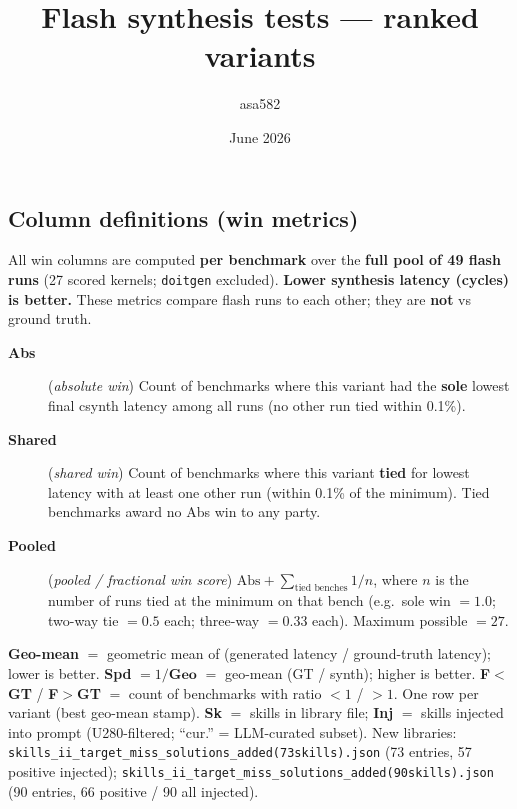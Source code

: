 \documentclass[11pt]{article}
\title{Flash synthesis tests --- ranked variants}
\author{asa582}
\date{June 2026}
\begin{document}
\maketitle

\subsection*{Column definitions (win metrics)}

All win columns are computed \textbf{per benchmark} over the \textbf{full pool of 49 flash runs}
(27 scored kernels; \texttt{doitgen} excluded). \textbf{Lower synthesis latency (cycles) is better.}
These metrics compare flash runs to each other; they are \textbf{not} vs ground truth.

\begin{description}
  \item[\textbf{Abs}] (\emph{absolute win})
    Count of benchmarks where this variant had the \textbf{sole} lowest final csynth latency
    among all runs (no other run tied within 0.1\%).
  \item[\textbf{Shared}] (\emph{shared win})
    Count of benchmarks where this variant \textbf{tied} for lowest latency with at least one
    other run (within 0.1\% of the minimum). Tied benchmarks award no Abs win to any party.
  \item[\textbf{Pooled}] (\emph{pooled / fractional win score})
    $\text{Abs} + \sum_{\text{tied benches}} 1/n$, where $n$ is the number of runs tied at the
    minimum on that bench (e.g.\ sole win $=1.0$; two-way tie $=0.5$ each; three-way $=0.33$ each).
    Maximum possible $=27$.
\end{description}

\noindent\textbf{Geo-mean} $=$ geometric mean of (generated latency / ground-truth latency); lower is better.
\textbf{Spd} $= 1/\textbf{Geo}$ $=$ geo-mean (GT / synth); higher is better.
\textbf{F$<$GT} / \textbf{F$>$GT} $=$ count of benchmarks with ratio $<1$ / $>1$.
One row per variant (best geo-mean stamp). \textbf{Sk} $=$ skills in library file; \textbf{Inj} $=$ skills injected into prompt (U280-filtered; ``cur.'' = LLM-curated subset).
New libraries: \texttt{skills\_ii\_target\_miss\_solutions\_added(73skills).json} (73 entries, 57 positive injected);
\texttt{skills\_ii\_target\_miss\_solutions\_added(90skills).json} (90 entries, 66 positive / 90 all injected).
\end{document}
